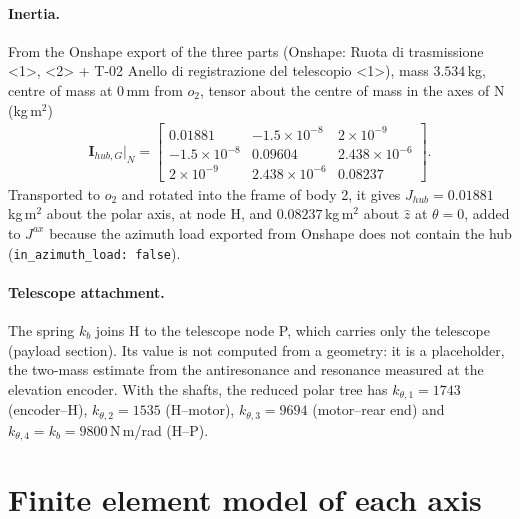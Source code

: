 \documentclass[10pt,a4paper]{article}
\numberwithin{equation}{section}
\begin{document}
\paragraph{Inertia.} From the Onshape export of the three parts (Onshape: Ruota di trasmissione <1>, <2> + T-02 Anello di registrazione del telescopio <1>), mass $3.534$\,kg, centre of mass at $0$\,mm from $o_2$, tensor about the centre of mass in the axes of N (kg\,m$^2$)
\begin{gather}
\mathbf I_{hub,G}|_N = \begin{bmatrix}0.01881 & -1.5\times10^{-8} & 2\times10^{-9} \\ -1.5\times10^{-8} & 0.09604 & 2.438\times10^{-6} \\ 2\times10^{-9} & 2.438\times10^{-6} & 0.08237\end{bmatrix}.
\end{gather}
Transported to $o_2$ and rotated into the frame of body 2, it gives $J_{hub} = 0.01881$\,kg\,m$^2$ about the polar axis, at node H, and $0.08237$\,kg\,m$^2$ about $\hat z$ at $\theta = 0$, added to $J^{ax}$ because the azimuth load exported from Onshape does not contain the hub (\texttt{in\_azimuth\_load: false}).
\paragraph{Telescope attachment.} The spring $k_b$ joins H to the telescope node P, which carries only the telescope (payload section). Its value is not computed from a geometry: it is a placeholder, the two-mass estimate from the antiresonance and resonance measured at the elevation encoder. With the shafts, the reduced polar tree has $k_{\theta,1} = 1743$ (encoder--H), $k_{\theta,2} = 1535$ (H--motor), $k_{\theta,3} = 9694$ (motor--rear end) and $k_{\theta,4} = k_b = 9800$\,N\,m/rad (H--P).
\section{\texorpdfstring{Finite element model of each axis}{Finite element model of each axis}}\label{sec:fem}
\end{document}
